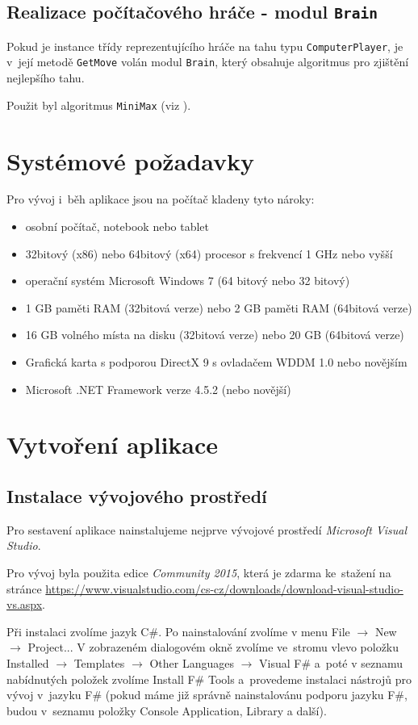 \documentclass[12pt]{article}
\begin{document}
\subsection{Realizace počítačového hráče - modul \texttt{Brain}}
Pokud je instance třídy reprezentujícího hráče na tahu typu \texttt{ComputerPlayer}, je v~její metodě \texttt{GetMove} volán modul \texttt{Brain}, který obsahuje algoritmus pro zjištění nejlepšího tahu.

Použit byl algoritmus \texttt{MiniMax} (viz \cite{kuhr2011}).


\section{Systémové požadavky}
Pro vývoj i~běh aplikace jsou na počítač kladeny tyto nároky:
	\begin{itemize}  
		\item osobní počítač, notebook nebo tablet
		\item 32bitový (x86) nebo 64bitový (x64) procesor s frekvencí 1 GHz nebo vyšší
		\item operační systém Microsoft Windows 7 (64 bitový nebo 32 bitový)
		\item 1 GB paměti RAM (32bitová verze) nebo 2 GB paměti RAM (64bitová verze)
		\item 16 GB volného místa na disku (32bitová verze) nebo 20 GB (64bitová verze)
		\item Grafická karta s podporou DirectX 9 s ovladačem WDDM 1.0 nebo novějším
		\item Microsoft .NET Framework verze 4.5.2 (nebo novější)
	\end{itemize}

\section{Vytvoření aplikace}
\subsection{Instalace vývojového prostředí}
Pro sestavení aplikace nainstalujeme nejprve vývojové prostředí \emph{Microsoft Visual Studio}.

Pro vývoj byla použita edice \emph{Community 2015}, která je zdarma ke~stažení na stránce \url{https://www.visualstudio.com/cs-cz/downloads/download-visual-studio-vs.aspx}. 

Při instalaci zvolíme jazyk C\#. Po nainstalování zvolíme v menu File $\rightarrow$ New $\rightarrow$ Project... V zobrazeném dialogovém okně zvolíme ve~stromu vlevo položku Installed $\rightarrow$ Templates $\rightarrow$ Other Languages $\rightarrow$ Visual F\# a~poté v seznamu nabídnutých položek zvolíme Install F\# Tools a~provedeme instalaci nástrojů pro vývoj v~jazyku F\# (pokud máme již správně nainstalovánu podporu jazyku F\#, budou v~seznamu položky Console Application, Library a další).
\end{document}
